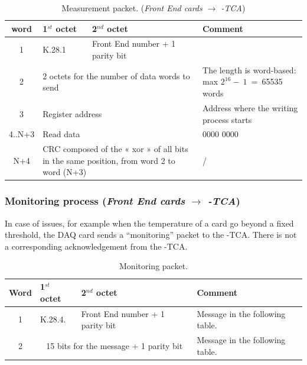 \begin{table} [!htbp]
  \centering
  \caption{Measurement packet. (\textit{Front End cards $\rightarrow$ {\charmu-TCA}})}
\begin{tabular}{|c|p{4cm}|p{4cm}|p{4cm}|}
\hline
\bf{word}  			& 	\bf{1$^{st}$ octet}	& \bf{2$^{nd}$ octet} & \bf{Comment} \\
\hline
1				&	K.28.1	&Front End number + 1 parity bit		&\\
\hline
2				&\multicolumn{2}{p{8cm}|}{2 octets for the number of data words to send}& The length is word-based: max $2^{16}-~1$~=~65535 words\\
\hline
3 			&      \multicolumn{2}{p{8cm}|}{Register address} & Address where the writing process starts\\
\hline
4..N+3        	&      \multicolumn{2}{p{8cm}|}{Read data} &0000 0000\\
\hline
N+4				 & \multicolumn{2}{p{8cm}|}{CRC composed of the « xor » of all bits in the same position, from word 2 to word (N+3)}&/\\
\hline
\end{tabular}
\end{table}


\newpage
\subsubsection{Monitoring process (\textit{Front End cards $\rightarrow$ {\charmu-TCA}})\newline}

In case of issues, for example when the temperature of a card go beyond a fixed threshold, the DAQ card sends a \enquote{monitoring} packet to the \charmu-TCA. There is not a corresponding acknowledgement from the \charmu-TCA.\newline


\begin{table} [!htbp]
  \centering
  \caption{Monitoring packet.}
\begin{tabular}{|c|p{4cm}|p{4cm}|p{4cm}|}
\hline
\bf{Word}  			& 	\bf{1$^{st}$ octet}	& \bf{2$^{nd}$ octet} & \bf{Comment} \\
\hline
	1				&	K.28.4.		& Front End number + 1 parity bit & Message in the following table.\\
\hline
	2				&	 \multicolumn{2}{c|}{15 bits for the message + 1 parity bit} 	& Message in the following table.\\
\hline
\end{tabular}
\end{table}

